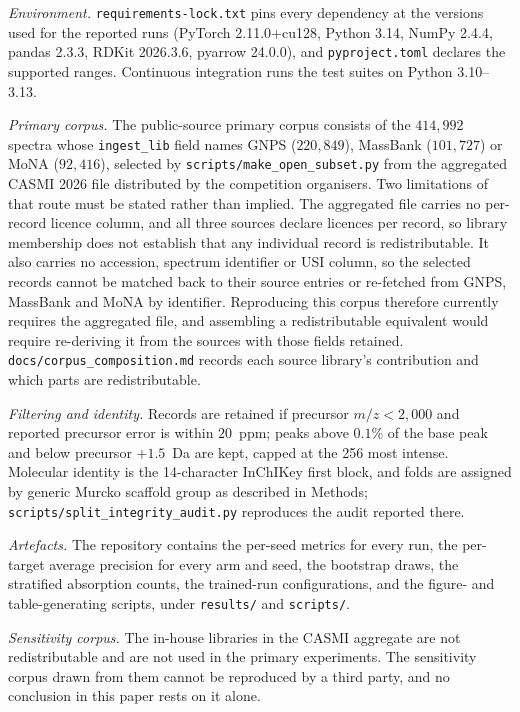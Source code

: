 \documentclass[11pt]{article}
\newcommand{\mz}{\ensuremath{m/z}}
\begin{document}
\emph{Environment.} \texttt{requirements-lock.txt} pins every dependency at the versions used for the reported runs (PyTorch 2.11.0+cu128, Python 3.14, NumPy 2.4.4, pandas 2.3.3, RDKit 2026.3.6, pyarrow 24.0.0), and \texttt{pyproject.toml} declares the supported ranges. Continuous integration runs the test suites on Python 3.10--3.13.

\emph{Primary corpus.} The public-source primary corpus consists of the $414{,}992$ spectra whose \texttt{ingest\_lib} field names GNPS ($220{,}849$), MassBank ($101{,}727$) or MoNA ($92{,}416$), selected by \texttt{scripts/make\_open\_subset.py} from the aggregated CASMI 2026 file distributed by the competition organisers. Two limitations of that route must be stated rather than implied. The aggregated file carries no per-record licence column, and all three sources declare licences per record, so library membership does not establish that any individual record is redistributable. It also carries no accession, spectrum identifier or USI column, so the selected records cannot be matched back to their source entries or re-fetched from GNPS, MassBank and MoNA by identifier. Reproducing this corpus therefore currently requires the aggregated file, and assembling a redistributable equivalent would require re-deriving it from the sources with those fields retained. \texttt{docs/corpus\_composition.md} records each source library's contribution and which parts are redistributable.

\emph{Filtering and identity.} Records are retained if precursor $\mz<2{,}000$ and reported precursor error is within $20$~ppm; peaks above $0.1\%$ of the base peak and below precursor $+1.5$~Da are kept, capped at the 256 most intense. Molecular identity is the 14-character InChIKey first block, and folds are assigned by generic Murcko scaffold group as described in Methods; \texttt{scripts/split\_integrity\_audit.py} reproduces the audit reported there.

\emph{Artefacts.} The repository contains the per-seed metrics for every run, the per-target average precision for every arm and seed, the bootstrap draws, the stratified absorption counts, the trained-run configurations, and the figure- and table-generating scripts, under \texttt{results/} and \texttt{scripts/}.

\emph{Sensitivity corpus.} The in-house libraries in the CASMI aggregate are not redistributable and are not used in the primary experiments. The sensitivity corpus drawn from them cannot be reproduced by a third party, and no conclusion in this paper rests on it alone.
\end{document}
